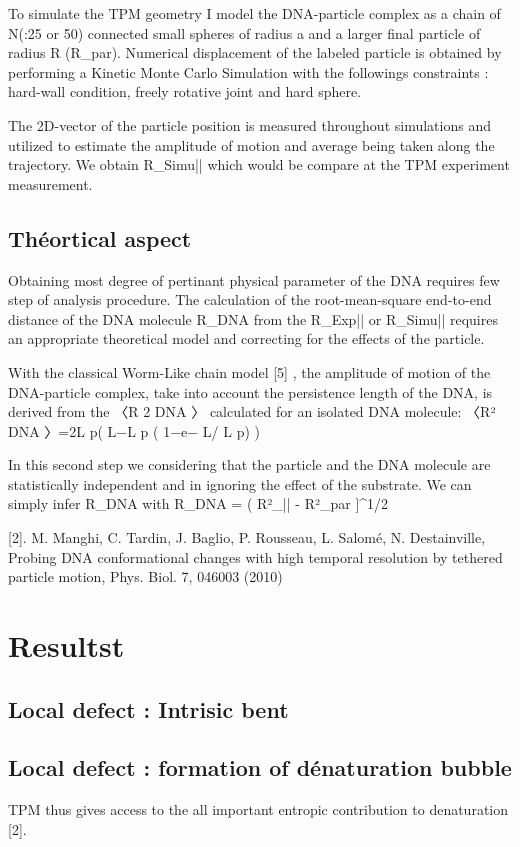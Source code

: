To simulate the TPM geometry I model the DNA-particle complex as a chain of N(:25 or 50) connected small spheres of radius a and a larger final particle of radius R (R_{par}). Numerical displacement of the labeled particle is obtained by performing a Kinetic Monte Carlo Simulation with the followings constraints : hard-wall condition, freely rotative joint and hard sphere.

The 2D-vector of the particle position  is measured throughout simulations and utilized to estimate the amplitude of motion and average being taken along the trajectory. We obtain R_{Simu||} which would be compare at the TPM experiment measurement.


\subsection{Théortical aspect}
Obtaining most degree of pertinant physical parameter of the DNA requires few step of analysis procedure. The calculation of the root-mean-square end-to-end distance of the DNA molecule R_{DNA} from the R_{Exp||} or R_{Simu||} requires an appropriate theoretical model and correcting for the effects of the particle.

With the classical Worm-Like chain model [5] , the amplitude of motion of the DNA-particle complex, take into account the persistence length of the DNA, is derived from the 〈R 2 DNA 〉 calculated for an isolated DNA molecule:
〈R² DNA 〉=2L p( L−L p ( 1−e− L/ L p) )

In this second step we considering that the particle and the DNA molecule are statistically independent and in ignoring the effect of the substrate. We can simply infer R_{DNA} with
R_{DNA}	= ( R²_{||} - R²_{par} ]^{1/2}



[2]. M. Manghi, C. Tardin, J. Baglio, P. Rousseau, L. Salomé, N. Destainville, Probing DNA conformational changes with high temporal resolution by tethered particle motion, Phys. Biol. 7, 046003 (2010)
\section{Resultst}

\subsection{Local defect : Intrisic bent}
\subsection{Local defect : formation of dénaturation bubble}
TPM thus gives access to the all important entropic contribution to denaturation [2].


